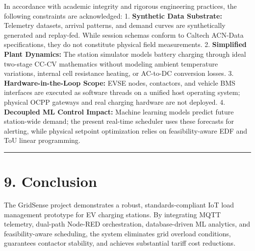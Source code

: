 \documentclass[
]{article}
\begin{document}
In accordance with academic integrity and rigorous engineering
practices, the following constraints are acknowledged: 1.
\textbf{Synthetic Data Substrate:} Telemetry datasets, arrival patterns,
and demand curves are synthetically generated and replay-fed. While
session schemas conform to Caltech ACN-Data specifications, they do not
constitute physical field measurements. 2. \textbf{Simplified Plant
Dynamics:} The station simulator models battery charging through ideal
two-stage CC-CV mathematics without modeling ambient temperature
variations, internal cell resistance heating, or AC-to-DC conversion
losses. 3. \textbf{Hardware-in-the-Loop Scope:} EVSE nodes, contactors,
and vehicle BMS interfaces are executed as software threads on a unified
host operating system; physical OCPP gateways and real charging hardware
are not deployed. 4. \textbf{Decoupled ML Control Impact:} Machine
learning models predict future station-wide demand; the present
real-time scheduler uses these forecasts for alerting, while physical
setpoint optimization relies on feasibility-aware EDF and ToU linear
programming.

\vspace{0.5em}\noindent\textcolor{gridsenseblue}{\rule{\linewidth}{0.6pt}}\vspace{0.5em}

\section{9. Conclusion}\label{conclusion}

The GridSense project demonstrates a robust, standards-compliant IoT
load management prototype for EV charging stations. By integrating MQTT
telemetry, dual-path Node-RED orchestration, database-driven ML
analytics, and feasibility-aware scheduling, the system eliminates grid
overload conditions, guarantees contactor stability, and achieves
substantial tariff cost reductions.
\end{document}
